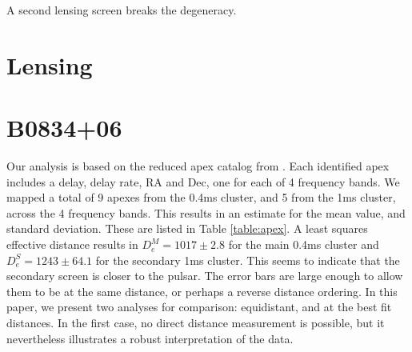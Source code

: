 \documentclass[useAMS,usenatbib]{mn2e}
\begin{document}
A second lensing screen breaks the degeneracy.

\section{Lensing}

\section{B0834+06}


Our analysis is based on the reduced apex catalog from
\citet{2010ApJ...708..232B}. Each identified apex includes a delay,
delay rate, RA and Dec, one for each of 4 frequency bands.  We mapped
a total of 9 apexes from the 0.4ms cluster, and 5 from the 1ms
cluster, across the 4 frequency bands.  This results in an estimate
for the mean value, and standard deviation.  These are listed in Table
\ref{table:apex}.  A least squares effective distance results in
$D_e^M=1017\pm 2.8$ for the main 0.4ms cluster and $D_e^S = 1243 \pm 64.1$ for
the secondary 1ms cluster.  This seems to indicate that the secondary
screen is closer to the pulsar.  The error bars are large enough to
allow them to be at the same distance, or perhaps a reverse distance
ordering.  In this paper, we present two analyses for comparison:
equidistant, and at the best fit distances.  In the first case, no
direct distance measurement is possible, but it nevertheless
illustrates a robust interpretation of the data.

\end{document}
